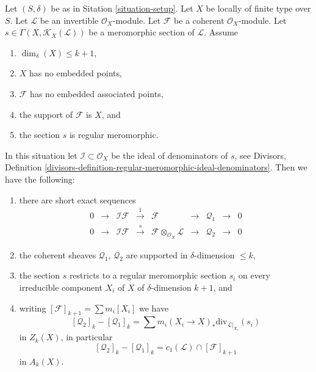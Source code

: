 \begin{lemma}
\label{lemma-no-embedded-points}
Let $(S, \delta)$ be as in Sitation \ref{situation-setup}.
Let $X$ be locally of finite type over $S$.
Let $\mathcal{L}$ be an invertible $\mathcal{O}_X$-module.
Let $\mathcal{F}$ be a coherent $\mathcal{O}_X$-module.
Let $s \in \Gamma(X, \mathcal{K}_X(\mathcal{L}))$ be a
meromorphic section of $\mathcal{L}$.
Assume
\begin{enumerate}
\item $\dim_\delta(X) \leq k + 1$,
\item $X$ has no embedded points,
\item $\mathcal{F}$ has no embedded associated points,
\item the support of $\mathcal{F}$ is $X$, and
\item the section $s$ is regular meromorphic.
\end{enumerate}
In this situation let $\mathcal{I} \subset \mathcal{O}_X$
be the ideal of denominators of $s$, see
Divisors,
Definition \ref{divisors-definition-regular-meromorphic-ideal-denominators}.
Then we have the following:
\begin{enumerate}
\item there are short exact sequences
$$
\begin{matrix}
0 &
\to &
\mathcal{I}\mathcal{F} &
\xrightarrow{1} &
\mathcal{F} &
\to &
\mathcal{Q}_1 &
\to &
0 \\
0 &
\to &
\mathcal{I}\mathcal{F} &
\xrightarrow{s} &
\mathcal{F} \otimes_{\mathcal{O}_X} \mathcal{L} &
\to &
\mathcal{Q}_2 &
\to &
0
\end{matrix}
$$
\item the coherent sheaves $\mathcal{Q}_1$, $\mathcal{Q}_2$ 
are supported in $\delta$-dimension $\leq k$,
\item the section $s$ restricts to a regular meromorphic
section $s_i$ on every irreducible component $X_i$ of
$X$ of $\delta$-dimension $k + 1$, and
\item writing $[\mathcal{F}]_{k + 1} = \sum m_i[X_i]$ we have
$$
[\mathcal{Q}_2]_k - [\mathcal{Q}_1]_k
=
\sum m_i(X_i \to X)_*\text{div}_{\mathcal{L}|_{X_i}}(s_i)
$$
in $Z_k(X)$, in particular
$$
[\mathcal{Q}_2]_k - [\mathcal{Q}_1]_k
=
c_1(\mathcal{L}) \cap [\mathcal{F}]_{k + 1}
$$
in $A_k(X)$.
\end{enumerate}
\end{lemma}

